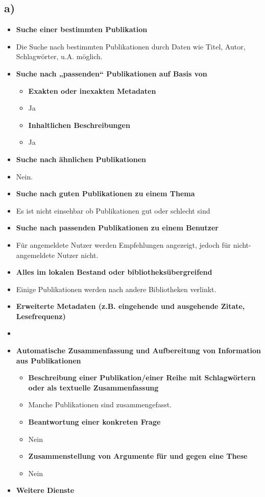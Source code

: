 \documentclass[11pt,a4paper,parskip=half ]{scrartcl}
\begin{document}
	\subsection*{a)}
		\begin{itemize}
			\item \textbf{Suche einer bestimmten Publikation}
			\item[] Die Suche nach bestimmten Publikationen durch Daten wie Titel, Autor, Schlagwörter, u.A. möglich.
			\item \textbf{Suche nach „passenden“ Publikationen auf Basis von}
			\begin{itemize}
				\item \textbf{Exakten oder inexakten Metadaten}
				\item[] Ja
				\item \textbf{Inhaltlichen Beschreibungen}
				\item[] Ja
			\end{itemize}
			\item \textbf{Suche nach ähnlichen Publikationen}
			\item[] Nein.
			\item \textbf{Suche nach \glqq{}guten\grqq{} Publikationen zu einem Thema}
			\item[] Es ist nicht einsehbar ob Publikationen \glqq{} gut\grqq{} oder \glqq{}schlecht\grqq{} sind
			\item \textbf{Suche nach \glqq{}passenden\grqq{} Publikationen zu einem Benutzer}
			\item[] Für angemeldete Nutzer werden Empfehlungen angezeigt, jedoch für nicht-angemeldete Nutzer nicht.
			\item \textbf{Alles im lokalen Bestand oder bibliotheksübergreifend}
			\item[] Einige Publikationen werden nach andere Bibliotheken verlinkt.
			\item \textbf{Erweiterte Metadaten (z.B. eingehende und ausgehende Zitate, Lesefrequenz)}
			\item[] 
			\item \textbf{Automatische Zusammenfassung und Aufbereitung von Information aus
			Publikationen}
			\begin{itemize}
				\item \textbf{Beschreibung einer Publikation/einer Reihe mit Schlagwörtern oder als textuelle Zusammenfassung}
				\item[] Manche Publikationen sind zusammengefasst.
				\item \textbf{Beantwortung einer konkreten Frage}
				\item[] Nein
				\item \textbf{Zusammenstellung von Argumente für und gegen eine These}
				\item[] Nein
			\end{itemize}
			\item \textbf{Weitere Dienste}
		\end{itemize}	
\end{document}
